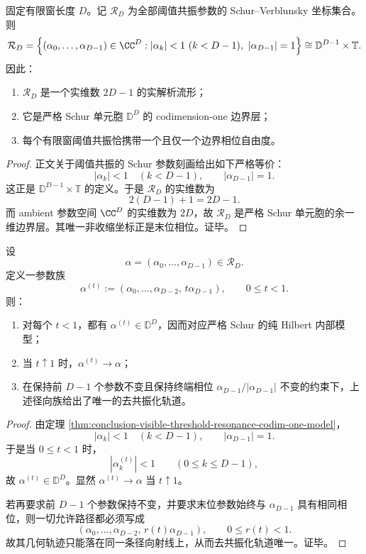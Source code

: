 \begin{theorem}[有限窗阈值共振参数域的余一维精确模型]\label{thm:conclusion-visible-threshold-resonance-codim-one-model}
固定有限窗长度 \(D\)。记 \(\mathcal R_D\) 为全部阈值共振参数的 Schur--Verblunsky 坐标集合。则
\[
\mathcal R_D
=
\Bigl\{
(\alpha_0,\dots,\alpha_{D-1})\in \CC^D:
|\alpha_k|<1\ (k<D-1),\ |\alpha_{D-1}|=1
\Bigr\}
\cong
\mathbb D^{D-1}\times \mathbb T.
\]
因此：
\begin{enumerate}
  \item \(\mathcal R_D\) 是一个实维数 \(2D-1\) 的实解析流形；
  \item 它是严格 Schur 单元胞 \(\mathbb D^D\) 的 codimension-one 边界层；
  \item 每个有限窗阈值共振恰携带一个且仅一个边界相位自由度。
\end{enumerate}
\end{theorem}
\begin{proof}
正文关于阈值共振的 Schur 参数刻画给出如下严格等价：
\[
|\alpha_k|<1\quad (k<D-1),
\qquad
|\alpha_{D-1}|=1.
\]
这正是 \(\mathbb D^{D-1}\times \mathbb T\) 的定义。于是 \(\mathcal R_D\) 的实维数为
\[
2(D-1)+1=2D-1.
\]
而 ambient 参数空间 \(\CC^D\) 的实维数为 \(2D\)，故 \(\mathcal R_D\) 是严格 Schur 单元胞的余一维边界层。其唯一非收缩坐标正是末位相位。证毕。
\end{proof}

\begin{theorem}[阈值共振的唯一径向去共振化]\label{thm:conclusion-visible-threshold-resonance-unique-radial-desingularization}
设
\[
\alpha=(\alpha_0,\dots,\alpha_{D-1})\in \mathcal R_D.
\]
定义一参数族
\[
\alpha^{(t)}:=(\alpha_0,\dots,\alpha_{D-2},\,t\alpha_{D-1}),
\qquad 0\le t<1.
\]
则：
\begin{enumerate}
  \item 对每个 \(t<1\)，都有 \(\alpha^{(t)}\in \mathbb D^D\)，因而对应严格 Schur 的纯 Hilbert 内部模型；
  \item 当 \(t\uparrow 1\) 时，\(\alpha^{(t)}\to \alpha\)；
  \item 在保持前 \(D-1\) 个参数不变且保持终端相位 \(\alpha_{D-1}/|\alpha_{D-1}|\) 不变的约束下，上述径向族给出了唯一的去共振化轨道。
\end{enumerate}
\end{theorem}
\begin{proof}
由定理 \ref{thm:conclusion-visible-threshold-resonance-codim-one-model}，
\[
|\alpha_k|<1\quad (k<D-1),
\qquad
|\alpha_{D-1}|=1.
\]
于是当 \(0\le t<1\) 时，
\[
|\alpha_k^{(t)}|<1
\qquad (0\le k\le D-1),
\]
故 \(\alpha^{(t)}\in \mathbb D^D\)。显然 \(\alpha^{(t)}\to\alpha\) 当 \(t\uparrow 1\)。

若再要求前 \(D-1\) 个参数保持不变，并要求末位参数始终与 \(\alpha_{D-1}\) 具有相同相位，则一切允许路径都必须写成
\[
(\alpha_0,\dots,\alpha_{D-2},\,r(t)\alpha_{D-1}),
\qquad 0\le r(t)<1.
\]
故其几何轨迹只能落在同一条径向射线上，从而去共振化轨道唯一。证毕。
\end{proof}

